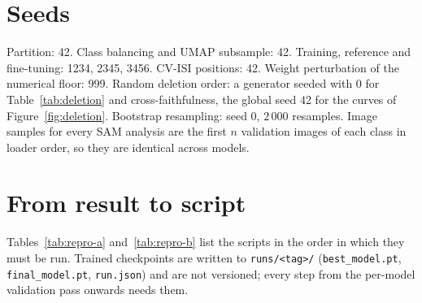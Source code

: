 \section{Seeds}

Partition: 42. Class balancing and UMAP subsample: 42. Training, reference and
fine-tuning: 1234, 2345, 3456. CV-ISI positions: 42. Weight perturbation of the
numerical floor: 999. Random deletion order: a generator seeded with 0 for
Table~\ref{tab:deletion} and cross-faithfulness, the global seed 42 for the
curves of Figure~\ref{fig:deletion}. Bootstrap
resampling: seed 0, $2\,000$ resamples. Image samples for
every SAM analysis are the first $n$ validation images of each class in loader
order, so they are identical across models.

\section{From result to script}

Tables~\ref{tab:repro-a} and~\ref{tab:repro-b} list the scripts in the order in
which they must be run. Trained checkpoints are written to
\texttt{runs/<tag>/} (\texttt{best\_model.pt}, \texttt{final\_model.pt},
\texttt{run.json}) and are not versioned; every step from the per-model
validation pass onwards needs them.

